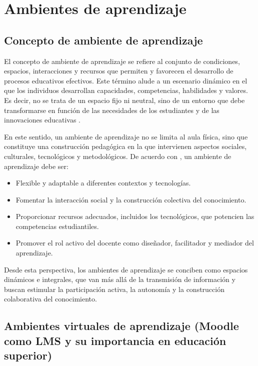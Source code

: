 \documentclass[letter,oneside,12pt,spanish]{report}
\begin{document}
\section{Ambientes de aprendizaje}

\subsection{Concepto de ambiente de aprendizaje}

El concepto de ambiente de aprendizaje se refiere al conjunto de condiciones, espacios, interacciones y recursos que permiten y favorecen el desarrollo de procesos educativos efectivos. Este término alude a un escenario dinámico en el que los individuos desarrollan capacidades, competencias, habilidades y valores. Es decir, no se trata de un espacio fijo ni neutral, sino de un entorno que debe transformarse en función de las necesidades de los estudiantes y de las innovaciones educativas \parencite{castro2019}.

En este sentido, un ambiente de aprendizaje no se limita al aula física, sino que constituye una construcción pedagógica en la que intervienen aspectos sociales, culturales, tecnológicos y metodológicos. De acuerdo con \textcite{castro2019}, un ambiente de aprendizaje debe ser:

\begin{itemize}
	\item Flexible y adaptable a diferentes contextos y tecnologías.
	\item Fomentar la interacción social y la construcción colectiva del conocimiento.
	\item Proporcionar recursos adecuados, incluidos los tecnológicos, que potencien las competencias estudiantiles.
	\item Promover el rol activo del docente como diseñador, facilitador y mediador del aprendizaje.
\end{itemize}

Desde esta perspectiva, los ambientes de aprendizaje se conciben como espacios dinámicos e integrales, que van más allá de la transmisión de información y buscan estimular la participación activa, la autonomía y la construcción colaborativa del conocimiento.

\subsection{Ambientes virtuales de aprendizaje (Moodle como LMS y su importancia en educación superior)}
\end{document}
